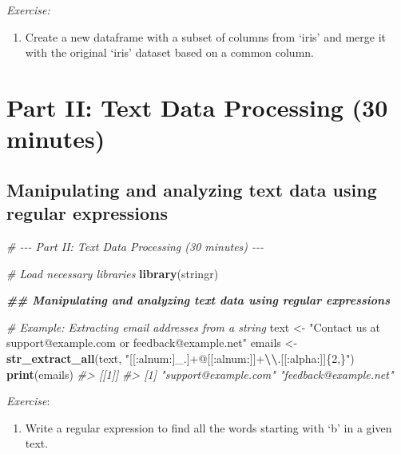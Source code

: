 \documentclass[
]{book}
\newenvironment{Shaded}{\begin{snugshade}}{\end{snugshade}}
\newcommand{\CommentTok}[1]{\textcolor[rgb]{0.56,0.35,0.01}{\textit{#1}}}
\newcommand{\DocumentationTok}[1]{\textcolor[rgb]{0.56,0.35,0.01}{\textbf{\textit{#1}}}}
\newcommand{\FunctionTok}[1]{\textcolor[rgb]{0.13,0.29,0.53}{\textbf{#1}}}
\newcommand{\NormalTok}[1]{#1}
\newcommand{\OtherTok}[1]{\textcolor[rgb]{0.56,0.35,0.01}{#1}}
\newcommand{\SpecialCharTok}[1]{\textcolor[rgb]{0.81,0.36,0.00}{\textbf{#1}}}
\newcommand{\StringTok}[1]{\textcolor[rgb]{0.31,0.60,0.02}{#1}}
\providecommand{\tightlist}{%
  \setlength{\itemsep}{0pt}\setlength{\parskip}{0pt}}
\begin{document}
\emph{Exercise:}

\begin{enumerate}
\def\labelenumi{\arabic{enumi}.}
\setcounter{enumi}{1}
\tightlist
\item
  Create a new dataframe with a subset of columns from `iris' and merge it with the original `iris' dataset based on a common column.
\end{enumerate}

\chapter*{Part II: Text Data Processing (30 minutes)}\label{part-ii-text-data-processing-30-minutes}

\section*{Manipulating and analyzing text data using regular expressions}\label{manipulating-and-analyzing-text-data-using-regular-expressions}

\begin{Shaded}
\begin{Highlighting}[]
\CommentTok{\# {-}{-}{-} Part II: Text Data Processing (30 minutes) {-}{-}{-}}

\CommentTok{\# Load necessary libraries}
\FunctionTok{library}\NormalTok{(stringr)}

\DocumentationTok{\#\# Manipulating and analyzing text data using regular expressions}

\CommentTok{\# Example: Extracting email addresses from a string}
\NormalTok{text }\OtherTok{\textless{}{-}} \StringTok{"Contact us at support@example.com or feedback@example.net"}
\NormalTok{emails }\OtherTok{\textless{}{-}} \FunctionTok{str\_extract\_all}\NormalTok{(text, }\StringTok{"[[:alnum:]\_.]+@[[:alnum:]]+}\SpecialCharTok{\textbackslash{}\textbackslash{}}\StringTok{.[[:alpha:]]\{2,\}"}\NormalTok{)}
\FunctionTok{print}\NormalTok{(emails)}
\CommentTok{\#\textgreater{} [[1]]}
\CommentTok{\#\textgreater{} [1] "support@example.com"  "feedback@example.net"}
\end{Highlighting}
\end{Shaded}

\emph{Exercise}:

\begin{enumerate}
\def\labelenumi{\arabic{enumi}.}
\tightlist
\item
  Write a regular expression to find all the words starting with `b' in a given text.
\end{enumerate}
\end{document}
